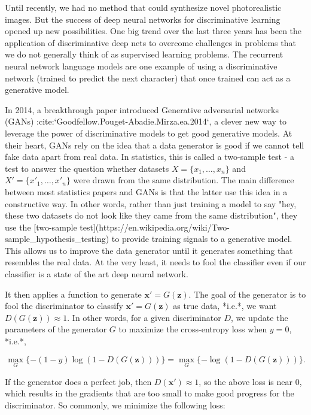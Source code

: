 Until recently, we had no method that could synthesize novel photorealistic images. But the success of deep neural networks for discriminative learning opened up new possibilities. One big trend over the last three years has been the application of discriminative deep nets to overcome challenges in problems that we do not generally think of as supervised learning problems. The recurrent neural network language models are one example of using a discriminative network (trained to predict the next character) that once trained can act as a generative model.

In 2014, a breakthrough paper introduced Generative adversarial networks (GANs) :cite:`Goodfellow.Pouget-Abadie.Mirza.ea.2014`, a clever new way to leverage the power of discriminative models to get good generative models. At their heart, GANs rely on the idea that a data generator is good if we cannot tell fake data apart from real data. In statistics, this is called a two-sample test - a test to answer the question whether datasets $X=\{x_1,\ldots, x_n\}$ and $X'=\{x'_1,\ldots, x'_n\}$ were drawn from the same distribution. The main difference between most statistics papers and GANs is that the latter use this idea in a constructive way. In other words, rather than just training a model to say "hey, these two datasets do not look like they came from the same distribution", they use the [two-sample test](https://en.wikipedia.org/wiki/Two-sample_hypothesis_testing) to provide training signals to a generative model. This allows us to improve the data generator until it generates something that resembles the real data. At the very least, it needs to fool the classifier even if our classifier is a state of the art deep neural network.

It then applies a function to generate $\mathbf x'=G(\mathbf z)$. The goal of the generator is to fool the discriminator to classify $\mathbf x'=G(\mathbf z)$ as true data, *i.e.*, we want $D( G(\mathbf z)) \approx 1$.
In other words, for a given discriminator $D$, we update the parameters of the generator $G$ to maximize the cross-entropy loss when $y=0$, *i.e.*,

$$ \max_G \{ - (1-y) \log(1-D(G(\mathbf z))) \} = \max_G \{ - \log(1-D(G(\mathbf z))) \}.$$

If the generator does a perfect job, then $D(\mathbf x')\approx 1$, so the above loss is near 0, which results in the gradients that are too small to make good progress for the discriminator. So commonly, we minimize the following loss:

